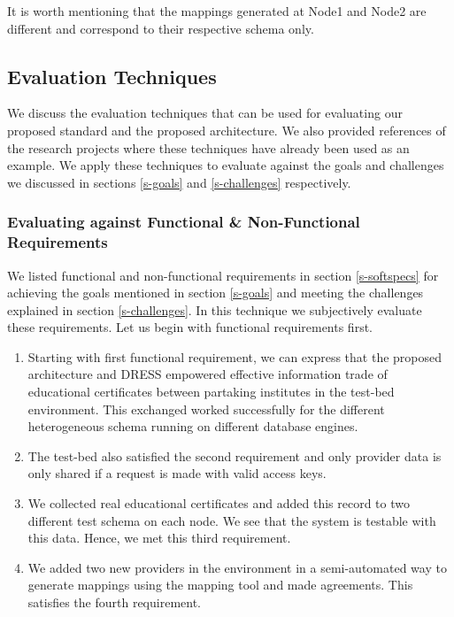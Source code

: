 \documentclass[12pt,a4paper,oneside]{book}
\begin{document}
It is worth mentioning that the mappings generated at Node1 and Node2 are different and correspond to their respective schema only. \\

	\subsection{Evaluation Techniques}
	We discuss the evaluation techniques that can be used for evaluating our proposed standard and the proposed architecture. We also provided references of the research projects where these techniques have already been used as an example. We apply these techniques to evaluate against the goals and challenges we discussed in sections \ref{s-goals} and \ref{s-challenges} respectively. \\
	
		\subsubsection{Evaluating against Functional \& Non-Functional Requirements}
		We listed functional and non-functional requirements in section \ref{s-softspecs} for achieving the goals mentioned in section \ref{s-goals} and meeting the challenges explained in section \ref{s-challenges}.  In this technique we subjectively evaluate these requirements. Let us begin with functional requirements first.
		
	\begin{enumerate}  

		\item Starting with first functional requirement, we can express that the proposed architecture and DRESS empowered effective information trade of educational certificates between partaking institutes in the test-bed environment. This exchanged worked successfully for the different heterogeneous schema running on different database engines. 

		\item The test-bed also satisfied the second requirement and only provider data is only shared if a request is made with valid access keys. 
	
		\item We collected real educational certificates and added this record to two different test schema on each node. We see that the system is testable with this data. Hence, we met this third requirement.
		
		\item We added two new providers in the environment in a semi-automated way to generate mappings using the mapping tool and made agreements. This satisfies the fourth requirement.

	\end{enumerate}
		
\end{document}
